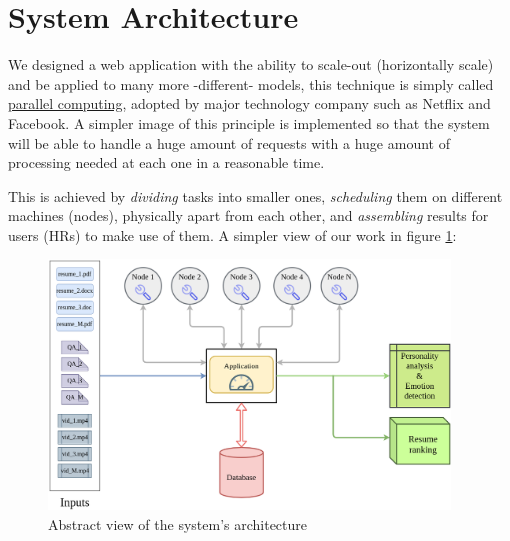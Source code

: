 


\section{System Architecture}
\label{sec:system_arch}
We designed a web application with the ability to scale-out (horizontally scale) and be applied to many more -different- models, this technique is simply called \href{https://www.journals.elsevier.com/parallel-computing}{\underline {parallel computing}}, adopted by major technology company such as Netflix and Facebook. A simpler image of this principle is implemented so that the system will be able to handle a huge amount of requests with a huge amount of processing needed at each one in a reasonable time.

This is achieved by \textit{dividing} tasks into smaller ones, \textit{scheduling} them on different machines (nodes), physically apart from each other, and \textit{assembling} results for users (HRs) to make use of them.
\newline
A simpler view of our work in figure \ref{fig:sys_2}:

\begin{figure}[h]
\centering
\includegraphics[width=0.95\textwidth]{images/sys_2.png}
\caption{Abstract view of the system's architecture}
\label{fig:sys_2}
\end{figure}

